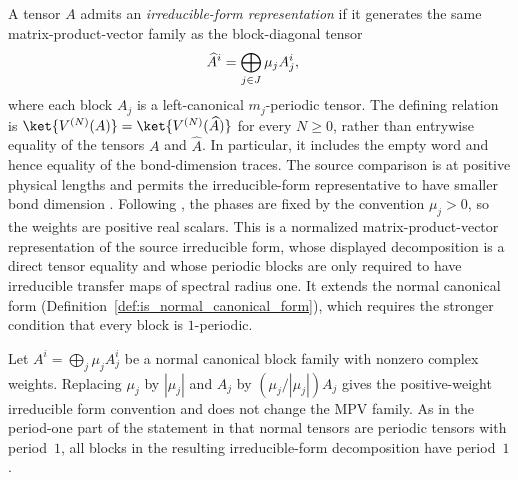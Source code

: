 \begin{definition}
    \label{def:irreducible_form}
    \leanok
    A tensor $A$ admits an \emph{irreducible-form representation} if it
    generates the same matrix-product-vector family as the block-diagonal
    tensor
    \begin{align}
        \widehat A^i
         & =\bigoplus_{j\in J}\mu_j A_j^i,
        \notag
    \end{align}
    where each block $A_j$ is a left-canonical $m_j$-periodic tensor. The
    defining relation is
    $\ket{V^{(N)}(A)}=\ket{V^{(N)}(\widehat A)}$ for every $N\geq0$, rather
    than entrywise equality of the tensors $A$ and $\widehat A$. In particular,
    it includes the empty word and hence equality of the bond-dimension traces.
    The source comparison is at positive physical lengths and permits the
    irreducible-form representative to have smaller bond dimension
    \cite[lines~266--271]{DeLasCuevas2017Irreducible}. Following
    \cite[Section~II]{DeLasCuevas2017Irreducible}, the phases are fixed by the
    convention $\mu_j>0$, so the weights are positive real scalars.
    This is a normalized matrix-product-vector representation of the source
    irreducible form, whose displayed decomposition is a direct tensor
    equality and whose periodic blocks are only required to have irreducible
    transfer maps of spectral radius one. It extends the normal canonical form
    (Definition~\ref{def:is_normal_canonical_form}),
    which requires the stronger condition that every block is $1$-periodic.
\end{definition}

\begin{remark}
    \label{rem:irr_form_vs_ncf}
    \leanok
    Let $A^i=\bigoplus_j\mu_j A_j^i$ be a normal canonical block family with
    nonzero complex weights. Replacing $\mu_j$ by $|\mu_j|$ and $A_j$ by
    $(\mu_j/|\mu_j|)A_j$ gives the positive-weight irreducible form convention
    and does not change the MPV family. As in the period-one part of the
    statement in \cite[Section~II]{DeLasCuevas2017Irreducible} that normal
    tensors are periodic tensors with period~$1$, all blocks in the resulting
    irreducible-form decomposition have period~$1$.
\end{remark}


